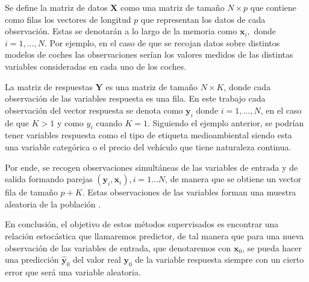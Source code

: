 \begin{defi}
Se define la matriz de datos $\textbf{X}$ como una matriz de tamaño $N\times p$ que contiene como filas los vectores de longitud $p$ que representan los datos de cada observación. Estas se denotarán a lo largo de la memoria como $\textbf{x}_i,$ donde $i=1,\ldots, N$. Por ejemplo, en el caso de que se recojan datos sobre distintos modelos de coches las observaciones serían los valores medidos de las distintas variables consideradas en cada uno de los coches. 
\end{defi}

\begin{defi}
La matriz de respuestas $\textbf{Y}$ es una matriz de tamaño $N \times K$, donde cada observación de las variables respuesta es una fila. En este trabajo cada observación del vector respuesta se denota como $\mathbf{y}_i$ donde $i=1,\ldots, N$, en el caso de que $K>1$ y como $y_i$ cuando $K=1$. Siguiendo el ejemplo anterior, se podrían tener variables respuesta como el tipo de etiqueta medioambiental siendo esta una variable categórica o el precio del vehículo que tiene naturaleza continua.
\end{defi}

\noindent Por ende, se recogen observaciones simultáneas de las variables de entrada y de salida formando parejas $(\mathbf{y}_i,\textbf{x}_i), i=1\ldots N$, de manera que se obtiene un vector fila de tamaño $p+K$. Estas observaciones de las variables forman una muestra aleatoria de la población .


\noindent En conclusión, el objetivo de estos métodos supervisados es encontrar una relación estocástica que llamaremos predictor, de tal manera que para una nueva observación de las variables de entrada, que denotaremos con $\textbf{x}_0$, se pueda hacer una predicción $\hat{\textbf{y}}_0$ del valor real $\textbf{y}_0$ de la variable respuesta siempre con un cierto error que será una variable  aleatoria. 
 
